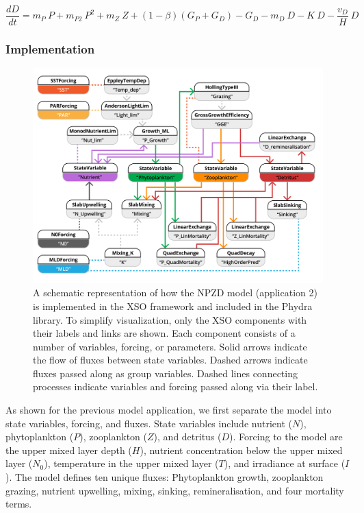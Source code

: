 \documentclass[journal abbreviation, manuscript]{copernicus}
\begin{document}
\begin{equation}
    \frac{d D}{d t} = 
    m_P \ P %
    + m_{P2} \ P^2 %
    + m_Z \ Z %
    + (1 - \beta)(G_P + G_D) %
    - G_D %
    - m_D \ D %
    - K \ D %
    - \frac{v_D}{H} \ D %
\end{equation}


\subsubsection{Implementation}

\begin{figure}[t]
\includegraphics[width=15cm]{Figures/firstdraft_schematics/code_schematics/EMPOWER.pdf}
\caption{A schematic representation of how the NPZD model (application 2) is implemented in the XSO framework and included in the Phydra library. To simplify visualization, only the XSO components with their labels and links are shown. Each component consists of a number of variables, forcing, or parameters. Solid arrows indicate the flow of fluxes between state variables. Dashed arrows indicate fluxes passed along as group variables. Dashed lines connecting processes indicate variables and forcing passed along via their label.}
\label{Figure:CodeSchematics_2}
\end{figure}

As shown for the previous model application, we first separate the model into state variables, forcing, and fluxes.  State variables include nutrient ($N$), phytoplankton ($P$), zooplankton ($Z$), and detritus ($D$). Forcing to the model are the upper mixed layer depth ($H$), nutrient concentration below the upper mixed layer ($N_0$), temperature in the upper mixed layer ($T$), and irradiance at surface ($I$). The model defines ten unique fluxes: Phytoplankton growth, zooplankton grazing, nutrient upwelling, mixing, sinking, remineralisation, and four mortality terms.
\end{document}
